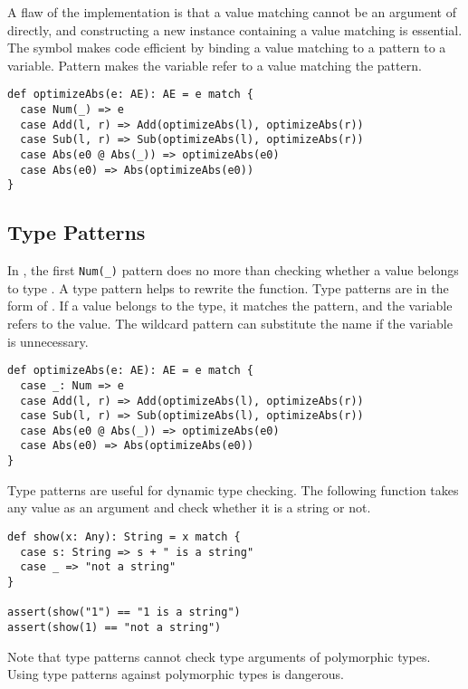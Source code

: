 A flaw of the implementation is that a value matching 
cannot be an argument of  directly, and constructing a new
 instance containing a value matching  is essential.
The  symbol makes code efficient by binding a value matching to a pattern to a variable.
Pattern  makes the variable refer to a value
matching the pattern.

\begin{verbatim}
def optimizeAbs(e: AE): AE = e match {
  case Num(_) => e
  case Add(l, r) => Add(optimizeAbs(l), optimizeAbs(r))
  case Sub(l, r) => Sub(optimizeAbs(l), optimizeAbs(r))
  case Abs(e0 @ Abs(_)) => optimizeAbs(e0)
  case Abs(e0) => Abs(optimizeAbs(e0))
}
\end{verbatim}

\subsection{Type Patterns}

In ,
the first \verb!Num(_)! pattern does no more than checking whether a value
belongs to type . A type pattern helps to rewrite the function. Type
patterns are in the form of \code{[name]: [type]}. If a value belongs to the
type, it matches the pattern, and the variable refers to the value. The wildcard
pattern can substitute the name if the variable is unnecessary.

\begin{verbatim}
def optimizeAbs(e: AE): AE = e match {
  case _: Num => e
  case Add(l, r) => Add(optimizeAbs(l), optimizeAbs(r))
  case Sub(l, r) => Sub(optimizeAbs(l), optimizeAbs(r))
  case Abs(e0 @ Abs(_)) => optimizeAbs(e0)
  case Abs(e0) => Abs(optimizeAbs(e0))
}
\end{verbatim}

Type patterns are useful for dynamic type checking. The following function takes
any value as an argument and check whether it is a string or
not.

\begin{verbatim}
def show(x: Any): String = x match {
  case s: String => s + " is a string"
  case _ => "not a string"
}

assert(show("1") == "1 is a string")
assert(show(1) == "not a string")
\end{verbatim}

Note that type patterns cannot check type arguments of polymorphic types. Using
type patterns against polymorphic types is dangerous.

